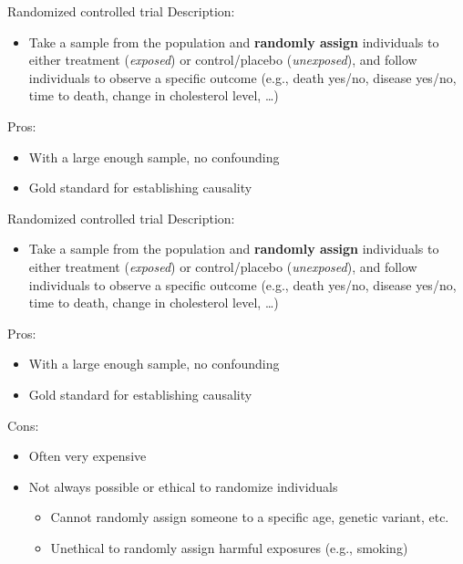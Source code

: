 \documentclass[10pt,t]{beamer}
\begin{document}
\begin{frame}{Randomized controlled trial}
Description:
\begin{itemize}
	\item Take a sample from the population and \textbf{randomly assign} individuals to either treatment (\textit{exposed}) or control/placebo (\textit{unexposed}), and follow individuals to observe a specific outcome (e.g., death yes/no, disease yes/no, time to death, change in cholesterol level, \dots)
\end{itemize}
Pros:
\begin{itemize}
	\item With a large enough sample, no confounding
	\item Gold standard for establishing causality
\end{itemize}
\end{frame}

\begin{frame}{Randomized controlled trial}
Description:
\begin{itemize}
	\item Take a sample from the population and \textbf{randomly assign} individuals to either treatment (\textit{exposed}) or control/placebo (\textit{unexposed}), and follow individuals to observe a specific outcome (e.g., death yes/no, disease yes/no, time to death, change in cholesterol level, \dots)
\end{itemize}
Pros:
\begin{itemize}
	\item With a large enough sample, no confounding
	\item Gold standard for establishing causality
\end{itemize}
Cons:
\begin{itemize}
	\item Often very expensive
	\item Not always possible or ethical to randomize individuals
	\begin{itemize}
		\item Cannot randomly assign someone to a specific age, genetic variant, etc.
		\item Unethical to randomly assign harmful exposures (e.g., smoking)
	\end{itemize}
\end{itemize}
\end{frame}
\end{document}
